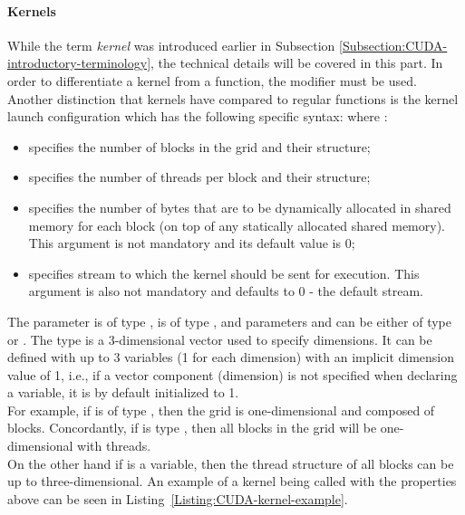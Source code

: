 \paragraph{Kernels}
While the term \textit{kernel} was introduced earlier in Subsection \ref{Subsection:CUDA-introductory-terminology}, the technical details will be covered in this part. In order to differentiate a kernel from a function, the  modifier must be used. Another distinction that kernels have compared to regular functions is the kernel launch configuration which has the following specific syntax:   where \cite{NVIDIAMay2022, Cejka2020}:

\begin{itemize}
	\item {} specifies the number of blocks in the grid and their structure;
	\item {} specifies the number of threads per block and their structure;
	\item {} specifies the number of bytes that are to be dynamically allocated in shared memory for each block (on top of any statically allocated shared memory). This argument is not mandatory and its default value is 0;
	\item {} specifies stream to which the kernel should be sent for execution. This argument is also not mandatory and defaults to 0 - the default stream.
\end{itemize}

The  parameter is of type ,  is of type , and parameters  and  can be either of type  or . The  type is a 3-dimensional  vector used to specify dimensions. It can be defined with up to 3 variables (1 for each dimension) with an implicit dimension value of 1, i.e., if a vector component (dimension) is not specified when declaring a  variable, it is by default initialized to 1. \\
For example, if  is of type , then the grid is one-dimensional and composed of  blocks. Concordantly, if  is type , then all blocks in the grid will be one-dimensional with  threads. \\
On the other hand if  is a  variable, then the thread structure of all blocks can be up to three-dimensional. An example of a kernel being called with the properties above can be seen in Listing~\ref{Listing:CUDA-kernel-example}.


